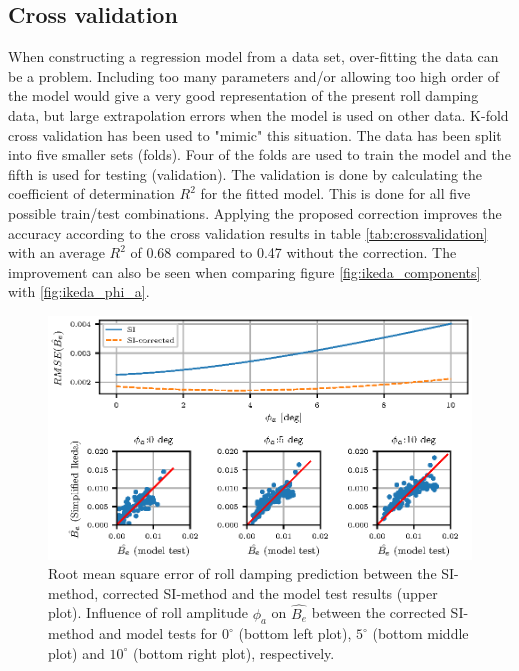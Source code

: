 \subsection{Cross validation}
When constructing a regression model from a data set, over-fitting the data can be a problem. Including too many parameters and/or allowing too high order of the model would give a very good representation of the present roll damping data, but large extrapolation errors when the model is used on other data. K-fold cross validation has been used to "mimic" this situation. The data has been split into five smaller sets (folds). Four of the folds are used to train the model and the fifth is used for testing (validation). The validation is done by calculating the coefficient of determination $R^2$ for the fitted model. This is done for all five possible train/test combinations. Applying the proposed correction improves the accuracy according to the cross validation results in table \ref{tab:crossvalidation} with an average $R^2$ of 0.68 compared to 0.47 without the correction. The improvement can also be seen when comparing figure \ref{fig:ikeda_components} with \ref{fig:ikeda_phi_a}.


\begin{figure}[H]
\vspace{-0.5cm}
\centering
  \centering
  \includegraphics[]{figures/ikeda_corrected_phi_a.eps}
  \vspace{-0.5cm}
  \caption{Root mean square error of roll damping prediction between the SI-method, corrected SI-method and the model test results (upper plot). Influence of roll amplitude $\phi_a$ on $\hat{B_e}$ between the corrected SI-method and model tests for $0^{\circ}$ (bottom left plot), $5^{\circ}$ (bottom middle plot) and $10^{\circ}$ (bottom right plot), respectively.}
  \label{fig:ikeda_phi_a_correction}
\end{figure}
